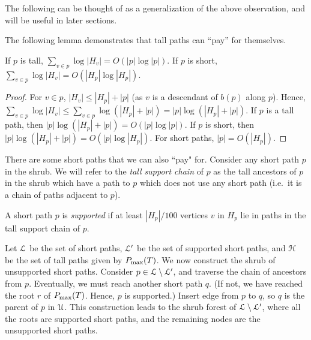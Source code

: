 {{The following can be thought of as a generalization of the above observation, and will be useful in later sections.
}



The following lemma demonstrates that tall paths can ``pay'' for themselves.

\begin{lemma}
\label{lem:pathBounds} If $p$ is tall, $\sum_{v\in p} \log |H_v| = O(|p| \log |p|)$.
If $p$ is short, $\sum_{v\in p} \log |H_v| = O(|H_p| \log |H_p|)$.
\end{lemma}
\begin{proof} 
For $v \in p$, $|H_v|\leq |H_{p}| + |p|$ (as $v$ is a descendant of $b(p)$ along $p$).
Hence, $\sum_{v\in p} \log |H_v| \leq \sum_{v\in p} \log(|H_{p}| + |p|)  = |p| \log (|H_{p}| + |p|)$.
 If $p$ is a tall path, then $|p| \log (|H_{p}| + |p|) = O(|p| \log |p|)$. If $p$ is short, then 
 $|p| \log (|H_{p}| + |p|) = O(|p| \log |H_{p}| )$. For short paths, $|p| = O(|H_p|)$.
\end{proof}


There are some short paths that we can also ``pay" for.  Consider any short path $p$ in the shrub.  We will refer to the 
\emph{tall support chain} of $p$ as the tall ancestors of $p$ in the shrub which have a path to $p$ which does not use any 
short path (i.e.\ it is a chain of paths adjacent to $p$).

\begin{definition} \label{def:support} A short path $p$ is \emph{supported} if
at least $|H_p|/100$ vertices $v$ in $H_p$ lie in paths in the tall support chain of $p$.
%
%
\end{definition}

Let ${\cal L}$ be the set of short paths, ${\cal L}'$ be the set of supported short paths, and ${\cal H}$ be the set of tall paths
given by $P_{\max}(T)$.
We now construct the shrub of unsupported short paths. Consider $p \in {\cal L} \setminus {\cal L}'$,
and traverse the chain of ancestors from $p$. Eventually, we must reach another short path $q$.
(If not, we have reached the root $r$ of $P_{\max}(T)$. Hence, $p$ is supported.)
Insert edge from $p$ to $q$, so $q$ is the parent of $p$ in ${\cal U}$. This construction leads
to the shrub forest of ${\cal L} \setminus {\cal L}'$, where all the roots are supported short paths, 
and the remaining nodes are the unsupported short paths.

}

